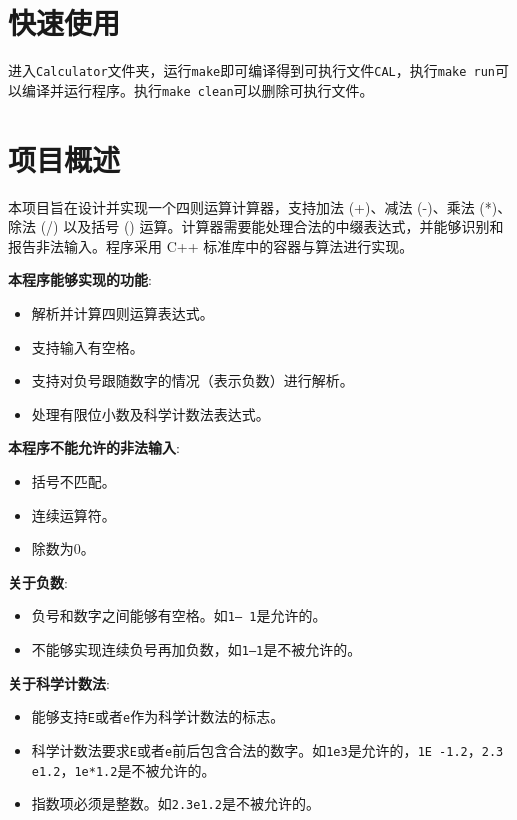 \documentclass[UTF8]{ctexart}
\begin{document}
\pagestyle{fancy}
\fancyhead{}

\section{快速使用}
进入\texttt{Calculator}文件夹，运行\texttt{make}即可编译得到可执行文件\texttt{CAL}，执行\texttt{make run}可以编译并运行程序。执行\texttt{make clean}可以删除可执行文件。

\section{项目概述}

本项目旨在设计并实现一个四则运算计算器，支持加法 (+)、减法 (-)、乘法 (*)、除法 (/) 以及括号 () 运算。计算器需要能处理合法的中缀表达式，并能够识别和报告非法输入。程序采用 C++ 标准库中的容器与算法进行实现。

\textbf{本程序能够实现的功能}:
\begin{itemize}
    \item 解析并计算四则运算表达式。
    \item 支持输入有空格。
    \item 支持对负号跟随数字的情况（表示负数）进行解析。
    \item 处理有限位小数及科学计数法表达式。
\end{itemize}

\textbf{本程序不能允许的非法输入}:
\begin{itemize}
    \item 括号不匹配。
    \item 连续运算符。
    \item 除数为0。
\end{itemize}

\textbf{关于负数}:
\begin{itemize}
    \item 负号和数字之间能够有空格。如\texttt{1-- 1}是允许的。
    \item 不能够实现连续负号再加负数，如\texttt{1---1}是不被允许的。
\end{itemize}

\textbf{关于科学计数法}:
\begin{itemize}
    \item 能够支持\texttt{E}或者\texttt{e}作为科学计数法的标志。
    \item 科学计数法要求\texttt{E}或者\texttt{e}前后包含合法的数字。如\texttt{1e3}是允许的，\texttt{1E -1.2}，\texttt{2.3 e1.2}，\texttt{1e*1.2}是不被允许的。
    \item 指数项必须是整数。如\texttt{2.3e1.2}是不被允许的。
\end{itemize}
\end{document}

